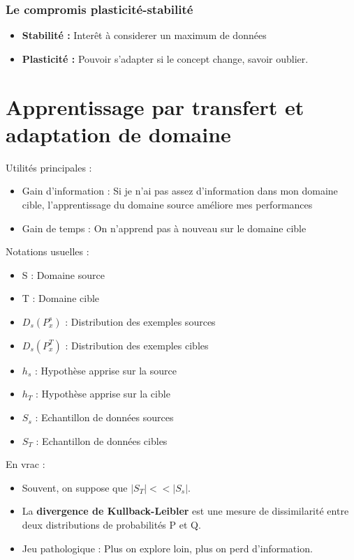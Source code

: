 \documentclass{article}
\begin{document}
\subsubsection*{Le compromis plasticité-stabilité}

\begin{itemize}
\item \textbf{Stabilité :} Interêt à considerer un maximum de données
\item \textbf{Plasticité :} Pouvoir s'adapter si le concept change, savoir oublier.
\end{itemize}

\section{Apprentissage par transfert et adaptation de domaine}

Utilités principales : 

\begin{itemize}
\item Gain d'information : Si je n'ai pas assez d'information dans mon domaine cible, l'apprentissage du domaine source améliore mes performances
\item Gain de temps : On n'apprend pas à nouveau sur le domaine cible
\end{itemize}

Notations usuelles : 
\begin{itemize}
\item S : Domaine source
\item T : Domaine cible
\item $D_s (P_x^s)$ : Distribution des exemples sources
\item $D_s (P_x^T)$ : Distribution des exemples cibles
\item $h_s$ : Hypothèse apprise sur la source
\item $h_T$ : Hypothèse apprise sur la cible
\item $S_s$ : Echantillon de données sources
\item $S_T$ : Echantillon de données cibles
\end{itemize}

En vrac :

\begin{itemize}

\item Souvent, on suppose que $ |S_T| << |S_s| $.

\item La \textbf{divergence de Kullback-Leibler} est une mesure de dissimilarité entre deux distributions de probabilités P et Q.

\item Jeu pathologique : Plus on explore loin, plus on perd d'information.

\end{itemize}
\end{document}
